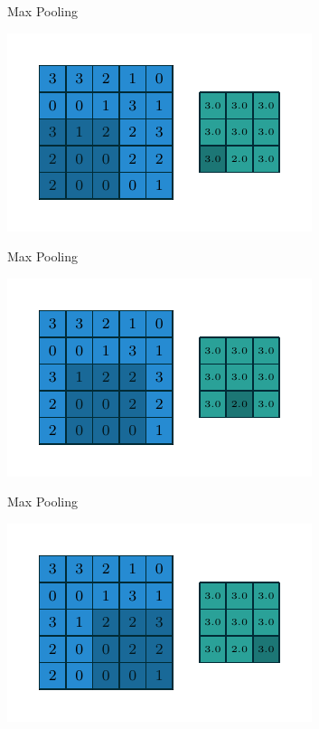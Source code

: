 \documentclass[10pt]{beamer}
\begin{document}
\begin{frame}{Max Pooling}
\begin{center}
\includegraphics[scale=1.5]{images/numerical_max_pooling_06.pdf}
\end{center}
\end{frame}

\begin{frame}{Max Pooling}
\begin{center}
\includegraphics[scale=1.5]{images/numerical_max_pooling_07.pdf}
\end{center}
\end{frame}

\begin{frame}{Max Pooling}
\begin{center}
\includegraphics[scale=1.5]{images/numerical_max_pooling_08.pdf}
\end{center}
\end{frame}
\end{document}
